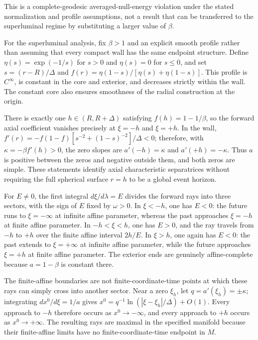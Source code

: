 \documentclass[11pt]{article}
\begin{document}
This is a complete-geodesic averaged-null-energy violation under the stated normalization and profile assumptions, not a result that can be transferred to the superluminal regime by substituting a larger value of $\beta$.

For the superluminal analysis, fix $\beta>1$ and an explicit smooth profile rather than assuming that every compact wall has the same endpoint structure. Define $\eta(s)=\exp(-1/s)$ for $s>0$ and $\eta(s)=0$ for $s\leq0$, and set $s=(r-R)/\Delta$ and $f(r)=\eta(1-s)/[\eta(s)+\eta(1-s)]$. This profile is $C^\infty$, is constant in the core and exterior, and decreases strictly within the wall. The constant core also ensures smoothness of the radial construction at the origin.

There is exactly one $h\in(R,R+\Delta)$ satisfying $f(h)=1-1/\beta$, so the forward axial coefficient vanishes precisely at $\xi=-h$ and $\xi=+h$. In the wall, $f'(r)=-f(1-f)[s^{-2}+(1-s)^{-2}]/\Delta<0$; therefore, with $\kappa=-\beta f'(h)>0$, the zero slopes are $a'(-h)=\kappa$ and $a'(+h)=-\kappa$. Thus $a$ is positive between the zeros and negative outside them, and both zeros are simple. These statements identify axial characteristic separatrices without requiring the full spherical surface $r=h$ to be a global event horizon.

For $E\neq0$, the first integral $d\xi/d\lambda=E$ divides the forward rays into three sectors, with the sign of $E$ fixed by $\omega>0$. In $\xi<-h$, one has $E<0$: the future runs to $\xi=-\infty$ at infinite affine parameter, whereas the past approaches $\xi=-h$ at finite affine parameter. In $-h<\xi<h$, one has $E>0$, and the ray travels from $-h$ to $+h$ over the finite affine interval $2h/E$. In $\xi>h$, one again has $E<0$: the past extends to $\xi=+\infty$ at infinite affine parameter, while the future approaches $\xi=+h$ at finite affine parameter. The exterior ends are genuinely affine-complete because $a=1-\beta$ is constant there.

The finite-affine boundaries are not finite-coordinate-time points at which these rays can simply cross into another sector. Near a zero $\xi_h$, let $q=a'(\xi_h)=\pm\kappa$; integrating $dx^0/d\xi=1/a$ gives $x^0=q^{-1}\ln(|\xi-\xi_h|/\Delta)+O(1)$. Every approach to $-h$ therefore occurs as $x^0\to-\infty$, and every approach to $+h$ occurs as $x^0\to+\infty$. The resulting rays are maximal in the specified manifold because their finite-affine limits have no finite-coordinate-time endpoint in $M$.
\end{document}
